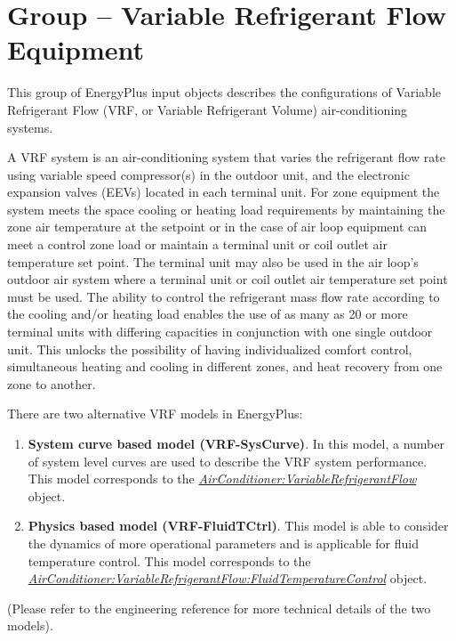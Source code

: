 \section{Group -- Variable Refrigerant Flow Equipment}\label{group-variable-refrigerant-flow-equipment}

This group of EnergyPlus input objects describes the configurations of Variable Refrigerant Flow (VRF, or Variable Refrigerant Volume) air-conditioning systems.

A VRF system is an air-conditioning system that varies the refrigerant flow rate using variable speed compressor(s) in the outdoor unit, and the electronic expansion valves (EEVs) located in each terminal unit. For zone equipment the system meets the space cooling or heating load requirements by maintaining the zone air temperature at the setpoint or in the case of air loop equipment can meet a control zone load or maintain a terminal unit or coil outlet air temperature set point. The terminal unit may also be used in the air loop's outdoor air system where a terminal unit or coil outlet air temperature set point must be used. The ability to control the refrigerant mass flow rate according to the cooling and/or heating load enables the use of as many as 20 or more terminal units with differing capacities in conjunction with one single outdoor unit. This unlocks the possibility of having individualized comfort control, simultaneous heating and cooling in different zones, and heat recovery from one zone to another.

There are two alternative VRF models in EnergyPlus:

\begin{enumerate}
\def\labelenumi{\arabic{enumi}.}
\item
  \textbf{System curve based model (VRF-SysCurve)}. In this model, a number of system level curves are used to describe the VRF system performance. This model corresponds to the \emph{\hyperref[airconditionervariablerefrigerantflow]{AirConditioner:VariableRefrigerantFlow}} object.
\item
  \textbf{Physics based model (VRF-FluidTCtrl)}. This model is able to consider the dynamics of more operational parameters and is applicable for fluid temperature control. This model corresponds to the \emph{\hyperref[airconditionervariablerefrigerantflowfluidtemperaturecontrol]{AirConditioner:VariableRefrigerantFlow:FluidTemperatureControl}} object.
\end{enumerate}

(Please refer to the engineering reference for more technical details of the two models).

